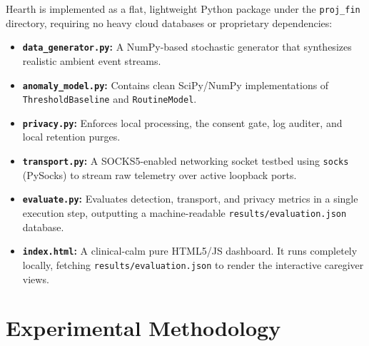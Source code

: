 \documentclass[conference]{IEEEtran}
\begin{document}
Hearth is implemented as a flat, lightweight Python package under the \texttt{proj\_fin} directory, requiring no heavy cloud databases or proprietary dependencies:
\begin{itemize}
  \item \textbf{\texttt{data\_generator.py}:} A NumPy-based stochastic generator that synthesizes realistic ambient event streams.
  \item \textbf{\texttt{anomaly\_model.py}:} Contains clean SciPy/NumPy implementations of \texttt{ThresholdBaseline} and \texttt{RoutineModel}.
  \item \textbf{\texttt{privacy.py}:} Enforces local processing, the consent gate, log auditer, and local retention purges.
  \item \textbf{\texttt{transport.py}:} A SOCKS5-enabled networking socket testbed using \texttt{socks} (PySocks) to stream raw telemetry over active loopback ports.
  \item \textbf{\texttt{evaluate.py}:} Evaluates detection, transport, and privacy metrics in a single execution step, outputting a machine-readable \texttt{results/evaluation.json} database.
  \item \textbf{\texttt{index.html}:} A clinical-calm pure HTML5/JS dashboard. It runs completely locally, fetching \texttt{results/evaluation.json} to render the interactive caregiver views.
\end{itemize}

\section{Experimental Methodology}
\end{document}
